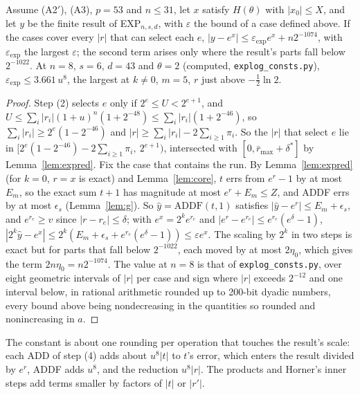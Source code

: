 \begin{theorem}\label{thm:exp}
Assume (A2$'$), (A3), $p = 53$ and $n \le 31$, let $x$ satisfy $H(\theta)$ with
$|x_0| \le X$, and let $y$ be the finite result of EXP$_{n,s,d}$, with $\varepsilon$ the bound of a case defined above.
If the cases cover every $|r|$ that can select each $e$, $|y - e^x| \le \varepsilon_{\exp}e^x + n2^{-1074}$, with
$\varepsilon_{\exp}$ the largest $\varepsilon$; the second term arises only where the result's parts fall below
$2^{-1022}$. At $n = 8$, $s = 6$, $d = 43$ and $\theta = 2$ (computed, \texttt{explog\_consts.py}), $\varepsilon_{\exp} \le
3.661\,u^8$, the largest at $k \ne 0$, $m = 5$, $r$ just above $-\frac12\ln 2$.
\end{theorem}

\begin{proof}
Step (2) selects $e$ only if $2^e \le U < 2^{e+1}$, and $U \le \sum_i|r_i|(1 + u)^n(1 + 2^{-48}) \le \sum_i|r_i|(1 +
2^{-46})$, so $\sum_i|r_i| \ge 2^e(1 - 2^{-46})$ and $|r| \ge \sum_i|r_i| - 2\sum_{i \ge 1}\pi_i$. So the $|r|$ that
select $e$ lie in $[2^e(1 - 2^{-46}) - 2\sum_{i \ge 1}\pi_i,\ 2^{e+1})$, intersected with $[0, \bar r_{\max} + \delta^*]$ by
Lemma~\ref{lem:expred}. Fix the case that contains the run. By Lemma~\ref{lem:expred} (for $k = 0$, $r = x$ is exact) and
Lemma~\ref{lem:core}, $t$ errs from $e^r - 1$ by at most $E_m$, so the exact sum $t + 1$ has magnitude at most $e^r +
E_m \le Z$, and ADDF errs by at most $\epsilon_s$ (Lemma~\ref{lem:g}). So $\hat y = \mathrm{ADDF}(t, 1)$ satisfies
$|\hat y - e^r| \le E_m + \epsilon_s$, and $e^{r_e} \ge v$ since $|r - r_e| \le \delta$; with $e^x = 2^ke^{r_e}$ and
$|e^r - e^{r_e}| \le e^{r_e}(e^\delta - 1)$, $|2^k\hat y - e^x| \le 2^k(E_m + \epsilon_s + e^{r_e}(e^\delta - 1)) \le
\varepsilon e^x$. The scaling by $2^k$ in two steps is exact but for parts that fall below $2^{-1022}$, each moved by at
most $2\eta_0$, which gives the term $2n\eta_0 = n2^{-1074}$. The value at $n = 8$ is that of
\texttt{explog\_consts.py}, over eight geometric intervals of $|r|$ per case and sign where $|r|$ exceeds $2^{-12}$ and
one interval below, in rational arithmetic rounded up to 200-bit dyadic numbers, every bound above being nondecreasing
in the quantities so rounded and nonincreasing in $a$.
\end{proof}

The constant is about one rounding per operation that touches the result's scale: each ADD of step (4) adds about
$u^8|t|$ to $t$'s error, which enters the result divided by $e^r$, ADDF adds $u^8$, and the reduction $u^8|r|$. The
products and Horner's inner steps add terms smaller by factors of $|t|$ or $|r'|$.

